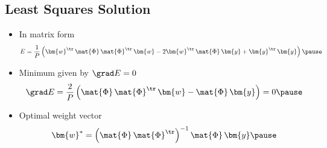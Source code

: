 \begin{slide}
\section{Least Squares Solution}

\begin{PauseHighLight}

\begin{itemize}
\item In matrix form
  \begin{displaymath}
    E = \frac{1}{P} \left( \strut \bm{w}^\tr \, \mat{\Phi} \,
    \mat{\Phi}^\tr \, \bm{w} - 2 \bm{w}^\tr \, \mat{\Phi} \, \bm{y} +
    \bm{y}^\tr \, \bm{y} \right)\pause
  \end{displaymath}
\item Minimum given by $\grad E=0$
  \begin{displaymath}
    \grad E = \frac{2}{P} \left( \strut \mat{\Phi} \,
    \mat{\Phi}^\tr\, \bm{w} - \mat{\Phi} \, \bm{y} \right)=0\pause
  \end{displaymath}
\item Optimal weight vector
  \begin{displaymath}
    \bm{w}^* = \left( \mat{\Phi} \, \mat{\Phi}^\tr \right)^{-1}
    \mat{\Phi} \, \bm{y} \pause
  \end{displaymath}
\end{itemize}

\end{PauseHighLight}
\end{slide}


